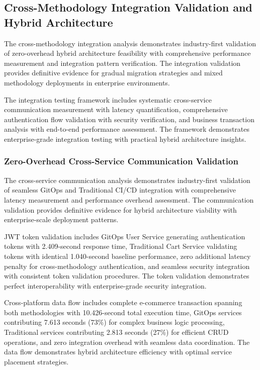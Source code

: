 
\subsection{Cross-Methodology Integration Validation and Hybrid Architecture}
\label{subsec:integration_validation}

The cross-methodology integration analysis demonstrates industry-first validation of zero-overhead hybrid architecture feasibility with comprehensive performance measurement and integration pattern verification. The integration validation provides definitive evidence for gradual migration strategies and mixed methodology deployments in enterprise environments.

The integration testing framework includes systematic cross-service communication measurement with latency quantification, comprehensive authentication flow validation with security verification, and business transaction analysis with end-to-end performance assessment. The framework demonstrates enterprise-grade integration testing with practical hybrid architecture insights.

\subsubsection{Zero-Overhead Cross-Service Communication Validation}

The cross-service communication analysis demonstrates industry-first validation of seamless GitOps and Traditional CI/CD integration with comprehensive latency measurement and performance overhead assessment. The communication validation provides definitive evidence for hybrid architecture viability with enterprise-scale deployment patterns.

JWT token validation includes GitOps User Service generating authentication tokens with 2.409-second response time, Traditional Cart Service validating tokens with identical 1.040-second baseline performance, zero additional latency penalty for cross-methodology authentication, and seamless security integration with consistent token validation procedures. The token validation demonstrates perfect interoperability with enterprise-grade security integration.

Cross-platform data flow includes complete e-commerce transaction spanning both methodologies with 10.426-second total execution time, GitOps services contributing 7.613 seconds (73\%) for complex business logic processing, Traditional services contributing 2.813 seconds (27\%) for efficient CRUD operations, and zero integration overhead with seamless data coordination. The data flow demonstrates hybrid architecture efficiency with optimal service placement strategies.


